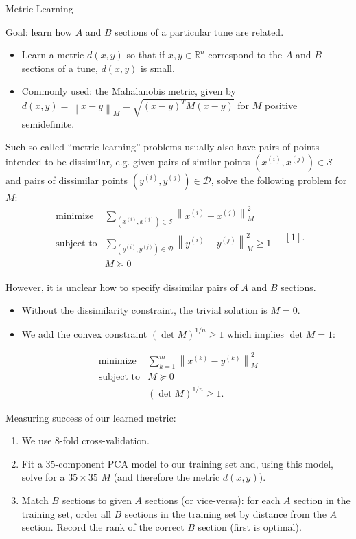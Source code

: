 \documentclass[letterpaper]{amsart}
\newcommand{\vectornorm}[1]{\left\lVert#1\right\rVert}
\begin{document}
\begin{center}
\Huge
Metric Learning
\end{center}
\huge
Goal: learn how $A$ and $B$ sections of a particular tune are related.
\begin{itemize}
\item Learn a metric $d(x,y)$ so that if $x, y \in \mathbb R^n$ correspond to the $A$ and $B$ sections of a tune, $d(x,y)$ is small.

\item Commonly used: the Mahalanobis metric, given by $d(x,y) = \vectornorm{x-y}_M = \sqrt{(x-y)^T M (x-y)}$ for $M$ positive semidefinite.

\end{itemize}

Such so-called ``metric learning'' problems usually also have pairs of points intended to be dissimilar, e.g. given pairs of similar points $(x^{(i)}, x^{(j)}) \in \mathcal S$ and pairs of dissimilar points $(y^{(i)}, y^{(j)}) \in \mathcal D$, solve the following problem for $M$:
\[
    \begin{array}{ll}
        \text{minimize} & \sum_{(x^{(i)}, x^{(j)}) \in \mathcal S} \vectornorm{x^{(i)} - x^{(j)}}_M^2 \\
        \text{subject to} & \sum_{(y^{(i)}, y^{(j)}) \in \mathcal D} \vectornorm{y^{(i)} - y^{(j)}}_M^2\geq1\\
        & M \succeq 0
    \end{array}\quad [1].
\]

However, it is unclear how to specify dissimilar pairs of $A$ and $B$ sections.
\begin{itemize}
\item Without the dissimilarity constraint, the trivial solution is $M=0$.

\item We add the convex constraint $(\det M)^{1/n} \geq 1$ which implies $\det M = 1$:
\end{itemize}
\[
    \begin{array}{ll}
        \text{minimize} & \displaystyle{\sum_{k=1}^m \vectornorm{x^{(k)} - y^{(k)}}_M^2} \\
        \text{subject to} & M \succeq 0 \\
        & (\det M)^{1/n} \geq 1.
    \end{array}
\]

\newpage

Measuring success of our learned metric:
\begin{enumerate}
\item We use 8-fold cross-validation.

\item Fit a 35-component PCA model to our training set and, using this model, solve for a $35\times35$ $M$ (and therefore the metric $d(x,y)$).

\item Match $B$ sections to given $A$ sections (or vice-versa): for each $A$ section in the training set, order all $B$ sections in the training set by distance from the $A$ section. Record the rank of the correct $B$ section (first is optimal).

\end{enumerate}
\end{document}
